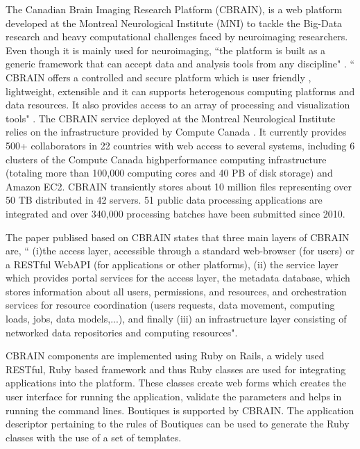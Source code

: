 The Canadian Brain Imaging Research Platform (CBRAIN), is a web platform developed at the Montreal Neurological Institute (MNI) to tackle the Big-Data research and heavy computational challenges faced by neuroimaging researchers. Even though it is mainly used for neuroimaging, ``the platform is built as a generic framework that can accept data and analysis tools from any discipline" \cite{DBLP:journals/fini/DasGRSPMSRSKMKR17}. `` CBRAIN offers a controlled and secure platform which is user friendly , lightweight, extensible and it can supports heterogenous computing platforms and data resources. It also provides access to an array of processing and visualization tools" . The CBRAIN service deployed at the Montreal Neurological Institute relies on the infrastructure provided by Compute Canada \cite{DAS20161188}. It currently provides 500+ collaborators in 22 countries with web access to several systems, including 6 clusters of the Compute Canada highperformance computing infrastructure (totaling more than 100,000 computing cores and 40 PB of disk storage) and Amazon EC2. CBRAIN transiently stores about 10 million files representing over 50 TB distributed in 42 servers. 51 public data processing applications are integrated and over 340,000 processing batches have been submitted since 2010.

The paper publised based on CBRAIN \cite{DBLP:journals/fini/DasGRSPMSRSKMKR17} states that three main layers of CBRAIN are, `` (i)the access layer, accessible through a standard web-browser (for users) or a RESTful WebAPI (for applications or other platforms), (ii) the service layer which provides portal services for the access layer, the metadata database, which stores information about all users, permissions, and resources, and orchestration services for resource coordination (users requests, data movement, computing loads, jobs, data models,...), and finally (iii) an infrastructure layer consisting of networked data repositories and computing resources".

CBRAIN components are implemented using Ruby on Rails, a widely used RESTful, Ruby based framework and thus Ruby classes are used for integrating applications into the platform. These classes create web forms which creates the user interface for running the application, validate the parameters and helps in running the command lines. Boutiques is supported by CBRAIN. The application descriptor pertaining to the rules of Boutiques can be used to generate the Ruby classes with the use of a set of templates.

